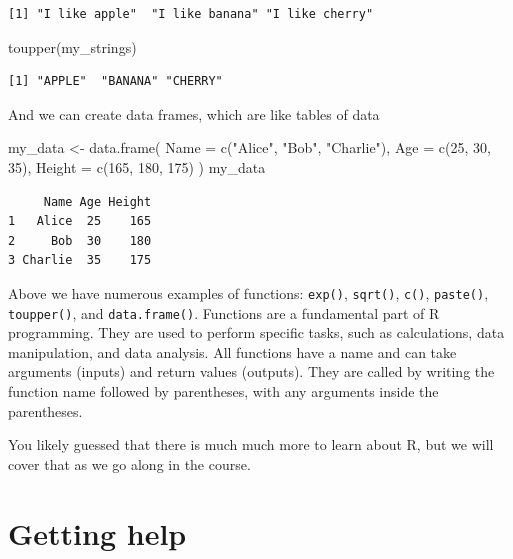 \documentclass[
  letterpaper,
  8pt,
  a4paper]{book}
\newenvironment{Shaded}{\begin{snugshade}}{\end{snugshade}}
\newcommand{\AttributeTok}[1]{\textcolor[rgb]{0.40,0.45,0.13}{#1}}
\newcommand{\DecValTok}[1]{\textcolor[rgb]{0.68,0.00,0.00}{#1}}
\newcommand{\FunctionTok}[1]{\textcolor[rgb]{0.28,0.35,0.67}{#1}}
\newcommand{\NormalTok}[1]{\textcolor[rgb]{0.00,0.23,0.31}{#1}}
\newcommand{\OtherTok}[1]{\textcolor[rgb]{0.00,0.23,0.31}{#1}}
\newcommand{\StringTok}[1]{\textcolor[rgb]{0.13,0.47,0.30}{#1}}
\begin{document}
\begin{verbatim}
[1] "I like apple"  "I like banana" "I like cherry"
\end{verbatim}

\begin{Shaded}
\begin{Highlighting}[]
\FunctionTok{toupper}\NormalTok{(my\_strings)}
\end{Highlighting}
\end{Shaded}

\begin{verbatim}
[1] "APPLE"  "BANANA" "CHERRY"
\end{verbatim}

And we can create data frames, which are like tables of data

\begin{Shaded}
\begin{Highlighting}[]
\NormalTok{my\_data }\OtherTok{\textless{}{-}} \FunctionTok{data.frame}\NormalTok{(}
  \AttributeTok{Name =} \FunctionTok{c}\NormalTok{(}\StringTok{"Alice"}\NormalTok{, }\StringTok{"Bob"}\NormalTok{, }\StringTok{"Charlie"}\NormalTok{),}
  \AttributeTok{Age =} \FunctionTok{c}\NormalTok{(}\DecValTok{25}\NormalTok{, }\DecValTok{30}\NormalTok{, }\DecValTok{35}\NormalTok{),}
  \AttributeTok{Height =} \FunctionTok{c}\NormalTok{(}\DecValTok{165}\NormalTok{, }\DecValTok{180}\NormalTok{, }\DecValTok{175}\NormalTok{)}
\NormalTok{)}
\NormalTok{my\_data}
\end{Highlighting}
\end{Shaded}

\begin{verbatim}
     Name Age Height
1   Alice  25    165
2     Bob  30    180
3 Charlie  35    175
\end{verbatim}

Above we have numerous examples of functions: \texttt{exp()},
\texttt{sqrt()}, \texttt{c()}, \texttt{paste()}, \texttt{toupper()}, and
\texttt{data.frame()}. Functions are a fundamental part of R
programming. They are used to perform specific tasks, such as
calculations, data manipulation, and data analysis. All functions have a
name and can take arguments (inputs) and return values (outputs). They
are called by writing the function name followed by parentheses, with
any arguments inside the parentheses.

You likely guessed that there is much much more to learn about R, but we
will cover that as we go along in the course.

\section*{Getting help}\label{getting-help}
\end{document}
